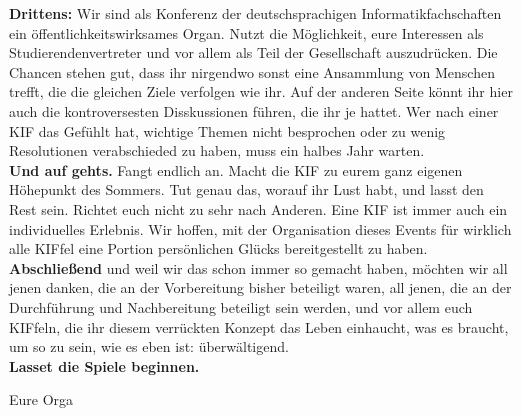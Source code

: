 \noindent\textbf{Drittens:}
Wir sind als Konferenz der deutschsprachigen Informatikfachschaften ein öffentlichkeitswirksames Organ.
Nutzt die Möglichkeit, eure Interessen als Studierendenvertreter und vor allem als Teil der Gesellschaft auszudrücken.
Die Chancen stehen gut, dass ihr nirgendwo sonst eine Ansammlung von Menschen trefft, die die gleichen Ziele verfolgen wie ihr.
Auf der anderen Seite könnt ihr hier auch die kontroversesten Disskussionen führen, die ihr je hattet.
Wer nach einer KIF das Gefühlt hat, wichtige Themen nicht besprochen oder zu wenig Resolutionen verabschieded zu haben, muss ein halbes Jahr warten.\\

\noindent\textbf{Und auf gehts.}
Fangt endlich an.
Macht die KIF zu eurem ganz eigenen Höhepunkt des Sommers.
Tut genau das, worauf ihr Lust habt, und lasst den Rest sein.
Richtet euch nicht zu sehr nach Anderen.
Eine KIF ist immer auch ein individuelles Erlebnis.
Wir hoffen, mit der Organisation dieses Events für wirklich alle KIFfel eine Portion persönlichen Glücks bereitgestellt zu haben.\\

\noindent\textbf{Abschließend} und weil wir das schon immer so gemacht haben, möchten wir all jenen danken, die an der Vorbereitung bisher beteiligt waren, all jenen, die an der Durchführung und Nachbereitung beteiligt sein werden, und vor allem euch KIFfeln, die ihr diesem verrückten Konzept das Leben einhaucht, was es braucht, um so zu sein, wie es eben ist: überwältigend.\\

\noindent\textbf{Lasset die Spiele beginnen.}

\vspace{5mm}
\noindent
Eure Orga
